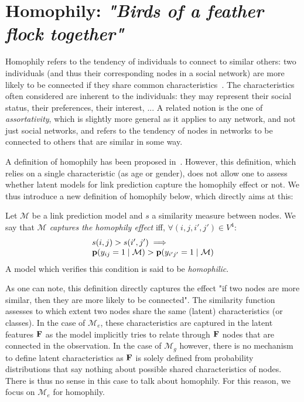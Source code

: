 \section{Homophily: \emph{"Birds of a feather flock together"}}
\label{sec:homophily}

Homophily refers to the tendency of individuals to connect to similar others: two individuals (and thus their corresponding nodes in a social network) are more likely to be connected if they share common characteristics~\cite{mcpherson2001birds,lazarsfeld1954friendship}. The characteristics often considered are inherent to the individuals: they may represent their social status, their preferences, their interest, ... A related notion is the one of {\it assortativity}, which is slightly more general as it applies to any network, and not just social networks, and refers to the tendency of nodes in networks to be connected to others that are similar in some way.

A definition of homophily has been proposed in~\cite{la2010randomization}. However, this definition, which relies on a single characteristic (as age or gender), does not allow one to assess whether latent models for link prediction capture the homophily effect or not. We thus introduce a new definition of homophily below, which directly aims at this:
%
\begin{definition}[Homophily]
	Let $\mathcal{M}$ be a link prediction model and $s$ a similarity measure between nodes. We say that \emph{$\mathcal{M}$ captures the homophily effect} iff, $\forall (i,j,i',j') \in V^4$:
%
\begin{equation}
\begin{array}{l}
s(i,j) > s(i',j')  \implies \nonumber \\
\mathbf{p}(y_{ij}=1 \mid \mathcal{M}) > \mathbf{p}(y_{i'j'}=1  \mid \mathcal{M}) \nonumber
\end{array}
\end{equation}
%
A model which verifies this condition is said to be \emph{homophilic}.
\end{definition}
%
As one can note, this definition directly captures the effect "if two nodes are more similar, then they are more likely to be connected". The similarity function assesses to which extent two nodes share the same (latent) characteristics (or classes). In the case of $\mathcal{M}_e$, these characteristics are captured in the latent features $\mathbf{F}$ as the model implicitly tries to relate through $\mathbf{F}$ nodes that are connected in the observation. In the case of $\mathcal{M}_g$ however, there is no mechanism to define latent characteristics as $\mathbf{F}$ is solely defined from probability distributions that say nothing about possible shared characteristics of nodes. There is thus no sense in this case to talk about homophily. For this reason, we focus on $\mathcal{M}_e$ for homophily. 

